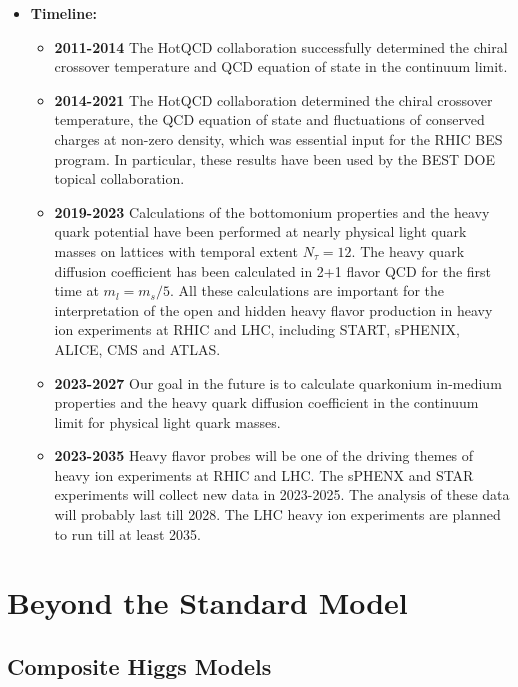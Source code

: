 \documentclass[12pt,hyperpdf]{article}
\begin{document}
\begin{itemize}
  \item{\bf Timeline:}
\begin{itemize}
   \item{\bf 2011-2014} The HotQCD collaboration successfully determined
     the chiral crossover temperature and QCD equation of state in the
     continuum limit. 
   \item{\bf 2014-2021} The HotQCD collaboration determined the chiral
     crossover temperature, the QCD equation of state and fluctuations
     of conserved charges at non-zero density, which was essential
     input for the RHIC BES program. In particular, these results have
     been used by the BEST DOE topical collaboration.
   \item{\bf 2019-2023} Calculations of the bottomonium properties and the
     heavy quark potential have been performed at nearly physical
     light quark masses on lattices with temporal extent
     $N_{\tau}=12$. The heavy quark diffusion coefficient has been
     calculated in 2+1 flavor QCD for the first time at
     $m_l=m_s/5$. All these calculations are important for the
     interpretation of the open and hidden heavy flavor production in
     heavy ion experiments at RHIC and LHC, including START, sPHENIX,
     ALICE, CMS and ATLAS.
   \item{\bf 2023-2027} Our goal in the future is to calculate quarkonium
     in-medium properties and the heavy quark diffusion coefficient in
     the continuum limit for physical light quark masses.
   \item{\bf 2023-2035} Heavy flavor probes will be one of the driving
     themes of heavy ion experiments at RHIC and LHC. The sPHENX and
     STAR experiments will collect new data in 2023-2025. The analysis
     of these data will probably last till 2028. The LHC heavy ion
     experiments are planned to run till at least 2035. 
\end{itemize}
\end{itemize}


\section{Beyond the Standard Model}\label{sec:BSM}

\subsection{Composite Higgs Models}
\end{document}
